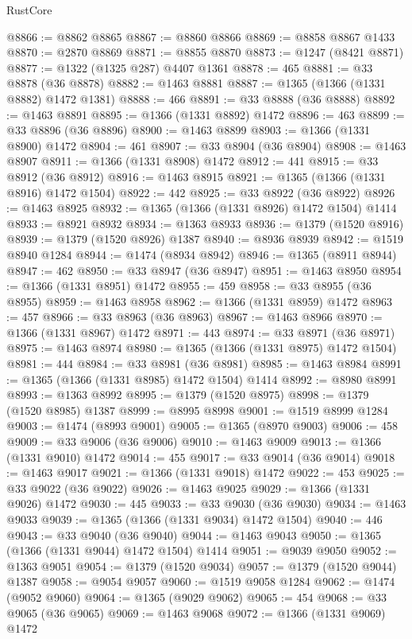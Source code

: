 \begin{lexlean}{RustCore}
\begin{coremodule}
@8866 := @8862 @8865
@8867 := @8860 @8866
@8869 := @8858 @8867 @1433
@8870 := @2870 @8869
@8871 := @8855 @8870
@8873 := @1247 (@8421 @8871)
@8877 := @1322 (@1325 @287) @4407 @1361
@8878 := 465
@8881 := @33 @8878 (@36 @8878)
@8882 := @1463 @8881
@8887 := @1365 (@1366 (@1331 @8882) @1472 @1381)
@8888 := 466
@8891 := @33 @8888 (@36 @8888)
@8892 := @1463 @8891
@8895 := @1366 (@1331 @8892) @1472
@8896 := 463
@8899 := @33 @8896 (@36 @8896)
@8900 := @1463 @8899
@8903 := @1366 (@1331 @8900) @1472
@8904 := 461
@8907 := @33 @8904 (@36 @8904)
@8908 := @1463 @8907
@8911 := @1366 (@1331 @8908) @1472
@8912 := 441
@8915 := @33 @8912 (@36 @8912)
@8916 := @1463 @8915
@8921 := @1365 (@1366 (@1331 @8916) @1472 @1504)
@8922 := 442
@8925 := @33 @8922 (@36 @8922)
@8926 := @1463 @8925
@8932 := @1365 (@1366 (@1331 @8926) @1472 @1504) @1414
@8933 := @8921 @8932
@8934 := @1363 @8933
@8936 := @1379 (@1520 @8916)
@8939 := @1379 (@1520 @8926) @1387
@8940 := @8936 @8939
@8942 := @1519 @8940 @1284
@8944 := @1474 (@8934 @8942)
@8946 := @1365 (@8911 @8944)
@8947 := 462
@8950 := @33 @8947 (@36 @8947)
@8951 := @1463 @8950
@8954 := @1366 (@1331 @8951) @1472
@8955 := 459
@8958 := @33 @8955 (@36 @8955)
@8959 := @1463 @8958
@8962 := @1366 (@1331 @8959) @1472
@8963 := 457
@8966 := @33 @8963 (@36 @8963)
@8967 := @1463 @8966
@8970 := @1366 (@1331 @8967) @1472
@8971 := 443
@8974 := @33 @8971 (@36 @8971)
@8975 := @1463 @8974
@8980 := @1365 (@1366 (@1331 @8975) @1472 @1504)
@8981 := 444
@8984 := @33 @8981 (@36 @8981)
@8985 := @1463 @8984
@8991 := @1365 (@1366 (@1331 @8985) @1472 @1504) @1414
@8992 := @8980 @8991
@8993 := @1363 @8992
@8995 := @1379 (@1520 @8975)
@8998 := @1379 (@1520 @8985) @1387
@8999 := @8995 @8998
@9001 := @1519 @8999 @1284
@9003 := @1474 (@8993 @9001)
@9005 := @1365 (@8970 @9003)
@9006 := 458
@9009 := @33 @9006 (@36 @9006)
@9010 := @1463 @9009
@9013 := @1366 (@1331 @9010) @1472
@9014 := 455
@9017 := @33 @9014 (@36 @9014)
@9018 := @1463 @9017
@9021 := @1366 (@1331 @9018) @1472
@9022 := 453
@9025 := @33 @9022 (@36 @9022)
@9026 := @1463 @9025
@9029 := @1366 (@1331 @9026) @1472
@9030 := 445
@9033 := @33 @9030 (@36 @9030)
@9034 := @1463 @9033
@9039 := @1365 (@1366 (@1331 @9034) @1472 @1504)
@9040 := 446
@9043 := @33 @9040 (@36 @9040)
@9044 := @1463 @9043
@9050 := @1365 (@1366 (@1331 @9044) @1472 @1504) @1414
@9051 := @9039 @9050
@9052 := @1363 @9051
@9054 := @1379 (@1520 @9034)
@9057 := @1379 (@1520 @9044) @1387
@9058 := @9054 @9057
@9060 := @1519 @9058 @1284
@9062 := @1474 (@9052 @9060)
@9064 := @1365 (@9029 @9062)
@9065 := 454
@9068 := @33 @9065 (@36 @9065)
@9069 := @1463 @9068
@9072 := @1366 (@1331 @9069) @1472

\end{coremodule}
\end{lexlean}
